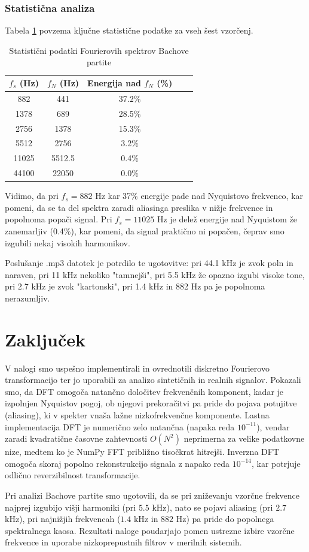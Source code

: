 \documentclass[12pt,a4paper]{article}
\begin{document}
\subsubsection{Statistična analiza}
Tabela \ref{tab:bach_stats} povzema ključne statistične podatke za vseh šest vzorčenj.

\begin{table}[H]
\centering
\caption{Statistični podatki Fourierovih spektrov Bachove partite}
\label{tab:bach_stats}
\begin{tabular}{|c|c|c|c|c|}
\hline
$f_s$ (Hz) & $f_N$ (Hz) & Energija nad $f_N$ (\%) \\
\hline
882 & 441 & 37.2\% \\
1378 & 689 & 28.5\% \\
2756 & 1378 & 15.3\% \\
5512 & 2756 & 3.2\% \\
11025 & 5512.5 & 0.4\% \\
44100 & 22050 & 0.0\% \\
\hline
\end{tabular}
\end{table}

Vidimo, da pri $f_s = 882$ Hz kar 37\% energije pade nad Nyquistovo frekvenco, kar pomeni, da se ta del spektra zaradi aliasinga preslika v nižje frekvence in popolnoma popači signal. Pri $f_s = 11025$ Hz je delež energije nad Nyquistom že zanemarljiv (0.4\%), kar pomeni, da signal praktično ni popačen, čeprav smo izgubili nekaj visokih harmonikov.

Poslušanje .mp3 datotek je potrdilo te ugotovitve: pri 44.1 kHz je zvok poln in naraven, pri 11 kHz nekoliko "tamnejši", pri 5.5 kHz že opazno izgubi visoke tone, pri 2.7 kHz je zvok "kartonski", pri 1.4 kHz in 882 Hz pa je popolnoma nerazumljiv.

\newpage

\section{Zaključek}

V nalogi smo uspešno implementirali in ovrednotili diskretno Fourierovo transformacijo ter jo uporabili za analizo sintetičnih in realnih signalov. Pokazali smo, da DFT omogoča natančno določitev frekvenčnih komponent, kadar je izpolnjen Nyquistov pogoj, ob njegovi prekoračitvi pa pride do pojava potujitve (aliasing), ki v spekter vnaša lažne nizkofrekvenčne komponente. Lastna implementacija DFT je numerično zelo natančna (napaka reda \(10^{-11}\)), vendar zaradi kvadratične časovne zahtevnosti \(O(N^2)\) neprimerna za velike podatkovne nize, medtem ko je NumPy FFT približno tisočkrat hitrejši. Inverzna DFT omogoča skoraj popolno rekonstrukcijo signala z napako reda \(10^{-14}\), kar potrjuje odlično reverzibilnost transformacije.

Pri analizi Bachove partite smo ugotovili, da se pri zniževanju vzorčne frekvence najprej izgubijo višji harmoniki (pri \(5.5\) kHz), nato se pojavi aliasing (pri \(2.7\) kHz), pri najnižjih frekvencah (\(1.4\) kHz in \(882\) Hz) pa pride do popolnega spektralnega kaosa. Rezultati naloge poudarjajo pomen ustrezne izbire vzorčne frekvence in uporabe nizkoprepustnih filtrov v merilnih sistemih.
\end{document}
